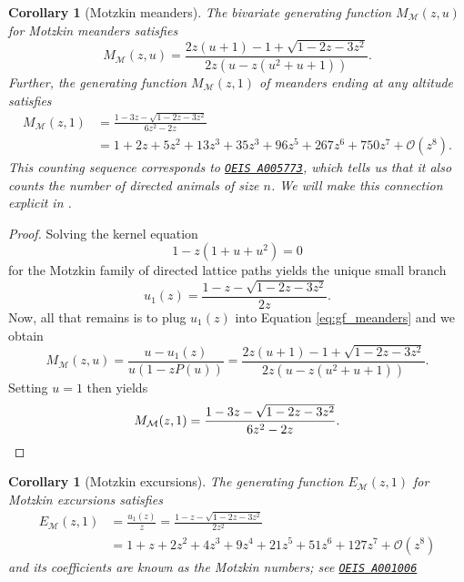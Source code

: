 \documentclass{article}
\newtheorem{corollary}[theorem]{Corollary}
\theoremstyle{definition}
\begin{document}
\begin{corollary}[Motzkin meanders] \label{cor:motzkin_meanders}
  The bivariate generating function $M_{\mathcal{M}}(z,u)$ for Motzkin meanders satisfies 
  $$
    M_{\mathcal{M}}(z,u) = \frac{2z(u + 1) - 1 + \sqrt{1 - 2z - 3 z^{2}}}{2z\left(u - z \left(u^{2}+u + 1\right)\right)}.
  $$
  Further, the generating function $M_{\mathcal{M}}(z, 1)$ of meanders ending at any altitude satisfies
  \begin{align*}
    M_{\mathcal{M}}(z, 1) &= \frac{1 - 3z - \sqrt{1 - 2z - 3z^2}}{6z^2 - 2z} \\
    &= 1 + 2z + 5z^{2} + 13z^{3} + 35z^{3} + 96z^{5} + 267z^{6} + 750z^7 + \mathcal{O}(z^8).
  \end{align*}
  This counting sequence corresponds to \href{https://oeis.org/A005773}{\texttt{OEIS A005773}}, which tells us that it also counts the number of directed animals of size $n$. We will make this connection explicit in .
\end{corollary}

\begin{proof}
  Solving the kernel equation
  $$
    1 - z(1 + u + u^2) = 0
  $$
  for the Motzkin family of directed lattice paths yields the unique small branch
  $$
    u_1(z) = \frac{1 - z - \sqrt{1 - 2z - 3z^2}}{2z}.
  $$
  Now, all that remains is to plug $u_1(z)$ into Equation \eqref{eq:gf_meanders} and we obtain
  $$
    M_{\mathcal{M}}(z,u) = \frac{u - u_1(z)}{u(1 - zP(u))} = \frac{2z(u + 1) - 1 + \sqrt{1 - 2z - 3 z^{2}}}{2z\left(u - z \left(u^{2}+u + 1\right)\right)}.
  $$
  Setting $u = 1$ then yields
  \begin{equation*}
    M_{\mathcal{M}}(z,1) = \frac{1 - 3z - \sqrt{1 - 2z - 3z^2}}{6z^2 - 2z}. \qedhere
  \end{equation*}
\end{proof}

\begin{corollary}[Motzkin excursions]
  \label{cor:motzkin_excursions}
  The generating function $E_{\mathcal{M}}(z,1)$ for Motzkin excursions satisfies 
  \begin{align*}
    E_{\mathcal{M}}(z,1) &= \frac{u_1(z)}{z} = \frac{1 - z - \sqrt{1 - 2z - 3z^2}}{2z^2} \\
    &= 1 + z + 2z^{2} + 4z^{3} + 9z^{4} + 21z^{5} + 51z^{6} + 127z^{7} + \mathcal{O}(z^{8})
  \end{align*}
  and its coefficients are known as the \textit{Motzkin numbers}; see \href{https://oeis.org/A001006}{\texttt{OEIS A001006}}
\end{corollary}
    
\end{document}
